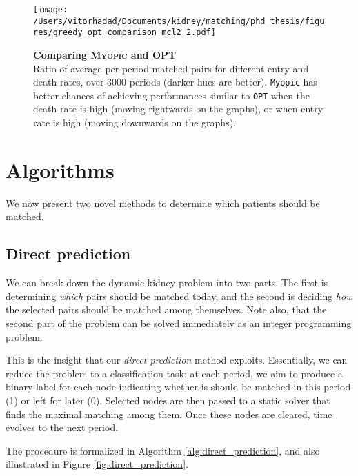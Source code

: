\begin{itemize}
\begin{figure}[htbp]
\centering
\hspace*{-3.5cm}
\texttt{[image: /Users/vitorhadad/Documents/kidney/matching/phd\_thesis/figures/greedy\_opt\_comparison\_mcl2\_2.pdf]}
\caption{\textbf{Comparing \textsc{Myopic} and \textsc{OPT}}  \\
Ratio of average per-period matched pairs for different entry and death rates, over 3000 periods (darker hues are better). \texttt{Myopic} has better chances of achieving performances similar to \texttt{OPT} when the death rate is high (moving rightwards on the graphs), or when entry rate is high (moving downwards on the graphs).}
\label{fig:greedy_opt_comparison}
\end{figure}




\section{Algorithms}

We now present two novel methods to determine which patients should be matched.

\subsection{Direct prediction} \label{subsec:direct_prediction}

We can break down the dynamic kidney problem into two parts. The first is determining \emph{which} pairs should be matched today, and the second is deciding \emph{how} the selected pairs should be matched among themselves. Note also, that the second part of the problem can be solved immediately as an integer programming problem. 

This is the insight that our \emph{direct prediction} method exploits. Essentially, we can reduce the problem to a classification task: at each period, we aim to produce a binary label for each node indicating whether is should be matched in this period (1) or left for later (0). Selected nodes are then passed to a static solver that finds the maximal matching among them. Once these nodes are cleared, time evolves to the next period. 

The procedure is formalized in Algorithm \ref{alg:direct_prediction}, and also illustrated in Figure \ref{fig:direct_prediction}.


\end{itemize}

